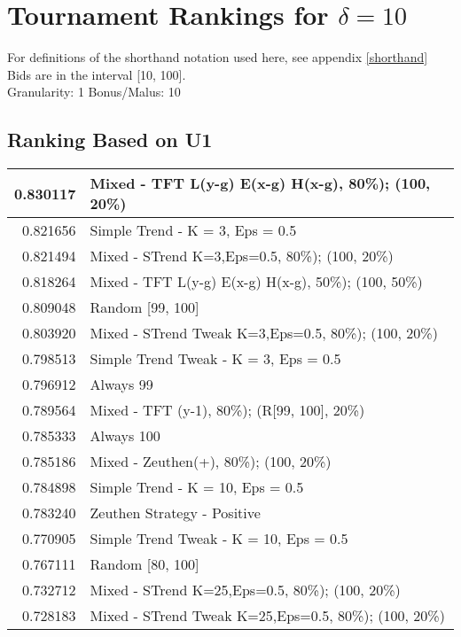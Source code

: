 \newpage  
\section{Tournament Rankings for $\delta = 10$}\label{results_10}
For definitions of the shorthand notation used here, see appendix \ref{shorthand} \\
\newline
Bids are in the interval [10, 100].\\
Granularity: 1\hspace{0.25in} Bonus/Malus: 10\\
\begin{table}[!hbtp]
\subsection{Ranking Based on U1}
\begin{footnotesize}
\begin{tabular}{|r|l|}\hline  \label{U3results}
0.830117 & Mixed - {TFT L(y-g) E(x-g) H(x-g), 80\%); (100, 20\%)}\\ \hline
0.821656 & Simple Trend - K = 3, Eps = 0.5\\ \hline
0.821494 & Mixed - {STrend K=3,Eps=0.5, 80\%); (100, 20\%)}\\ \hline
0.818264 & Mixed - {TFT L(y-g) E(x-g) H(x-g), 50\%); (100, 50\%)}\\ \hline
0.809048 & Random [99, 100]\\ \hline
0.803920 & Mixed - {STrend Tweak K=3,Eps=0.5, 80\%); (100, 20\%)}\\ \hline
0.798513 & Simple Trend Tweak - K = 3, Eps = 0.5\\ \hline
0.796912 & Always 99\\ \hline
0.789564 & Mixed - {TFT (y-1), 80\%); (R[99, 100], 20\%)}\\ \hline
0.785333 & Always 100\\ \hline
0.785186 & Mixed - {Zeuthen(+), 80\%); (100, 20\%)}\\ \hline
0.784898 & Simple Trend - K = 10, Eps = 0.5\\ \hline
0.783240 & Zeuthen Strategy - Positive\\ \hline
0.770905 & Simple Trend Tweak - K = 10, Eps = 0.5\\ \hline
0.767111 & Random [80, 100]\\ \hline
0.732712 & Mixed - {STrend K=25,Eps=0.5, 80\%); (100, 20\%)}\\ \hline
0.728183 & Mixed - {STrend Tweak K=25,Eps=0.5, 80\%); (100, 20\%)}\\ \hline

\end{tabular}
\end{footnotesize}
\end{table}
